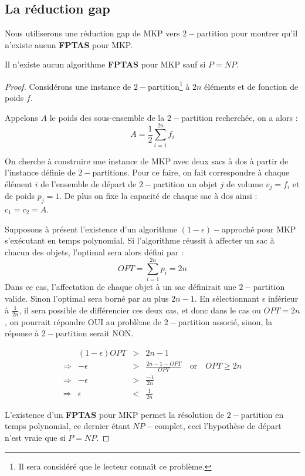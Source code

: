 \documentclass[a4paper,12pt]{thesis}
\begin{document}
\subsection*{La réduction gap}

Nous utiliserons une réduction gap de MKP vers $2-$partition pour montrer qu'il n'existe aucun
\textbf{FPTAS} pour MKP.

\begin{nthrm}
    \label{no_approx}
    Il n'existe aucun algorithme \textbf{FPTAS} pour MKP sauf si $P = NP$.
\end{nthrm}

\begin{proof}
    Considérons une instance de $2-$partition\footnote{Il sera considéré que le lecteur connaît ce
    problème.} à $2n$ éléments et de fonction de poids $f$.

    Appelons $A$ le poids des sous-ensemble de la $2-$partition recherchée, on a alors :
    \begin{displaymath}
        A = \frac{1}{2} \sum_{i = 1}^{2n} f_i
    \end{displaymath}

    On cherche à construire une instance de MKP avec deux sacs à dos à partir de l'instance définie
    de $2-$partitions. Pour ce faire, on fait correspondre à chaque élément $i$ de l'ensemble de
    départ de $2-$partition un objet $j$ de volume $v_j = f_i$ et de poids $p_j = 1$. De plus on
    fixe la capacité de chaque sac à dos ainsi : $c_1 = c_2 = A$.

    Supposons à présent l'existence d'un algorithme $(1 - \epsilon)-$approché pour MKP s'exécutant en
    temps polynomial. Si l'algorithme réussit à affecter un sac à chacun des objets, l'optimal sera
    alors défini par : \begin{displaymath}
        OPT = \sum_{i = 1}^{2n} p_i = 2n
    \end{displaymath}
    Dans ce cas, l'affectation de chaque objet à un sac définirait une $2-$partition valide.
    Sinon l'optimal sera borné par au plus $2n -1$. En sélectionnant $\epsilon$ inférieur à
    $\frac{1}{2n}$, il sera possible de différencier ces deux cas, et donc dans le cas ou $OPT =
    2n$, on pourrait répondre OUI au problème de $2-$partition associé, sinon, la réponse à
    $2-$partition serait NON.

    \begin{displaymath}
        \begin{array}{rrcl}
            & (1 - \epsilon) OPT & > & 2n - 1 \\
            \Rightarrow & - \epsilon & > & \displaystyle \frac{2n - 1 - OPT}{OPT} \quad \mbox{or} \quad OPT \geq 2n\\
            \Rightarrow & - \epsilon & > & \displaystyle \frac{-1}{2n} \\
            \Rightarrow & \epsilon & < & \displaystyle \frac{1}{2n}
        \end{array}
    \end{displaymath}

    L'existence d'un \textbf{FPTAS} pour MKP permet la résolution de $2-$partition en temps
    polynomial, ce dernier étant $NP-$complet, ceci l'hypothèse de départ n'est vraie que si $P=NP$.
\end{proof}
\end{document}
